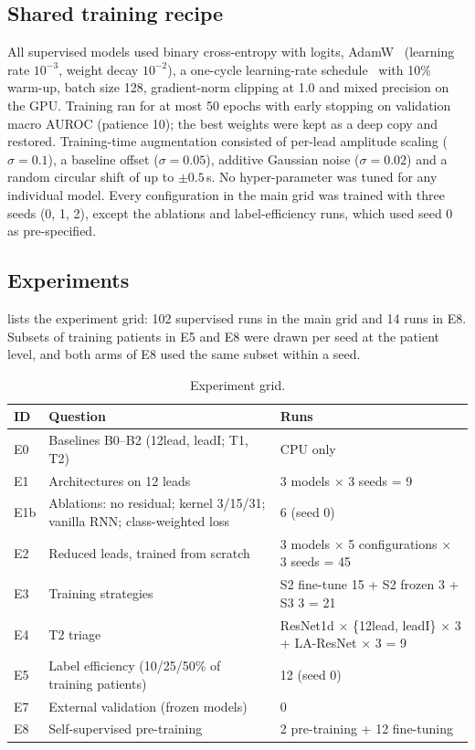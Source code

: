 \subsection{Shared training recipe}
All supervised models used binary cross-entropy with logits, AdamW~\cite{loshchilov2019adamw} (learning rate $10^{-3}$, weight decay $10^{-2}$), a one-cycle learning-rate schedule~\cite{smith2019onecycle} with 10\% warm-up, batch size 128, gradient-norm clipping at 1.0 and mixed precision on the GPU. Training ran for at most 50 epochs with early stopping on validation macro AUROC (patience 10); the best weights were kept as a deep copy and restored. Training-time augmentation consisted of per-lead amplitude scaling ($\sigma=0.1$), a baseline offset ($\sigma=0.05$), additive Gaussian noise ($\sigma=0.02$) and a random circular shift of up to $\pm0.5$\,s. No hyper-parameter was tuned for any individual model. Every configuration in the main grid was trained with three seeds (0, 1, 2), except the ablations and label-efficiency runs, which used seed 0 as pre-specified.

\subsection{Experiments}
 lists the experiment grid: 102 supervised runs in the main grid and 14 runs in E8. Subsets of training patients in E5 and E8 were drawn per seed at the patient level, and both arms of E8 used the same subset within a seed.

\begin{table}[H]
\centering
\small
\caption{Experiment grid.}
\label{tab:experiments}
\begin{tabular}{lp{7.2cm}p{5.2cm}}
\toprule
ID & Question & Runs \\
\midrule
E0 & Baselines B0--B2 (12lead, leadI; T1, T2) & CPU only \\
E1 & Architectures on 12 leads & 3 models $\times$ 3 seeds = 9 \\
E1b & Ablations: no residual; kernel 3/15/31; vanilla RNN; class-weighted loss & 6 (seed 0) \\
E2 & Reduced leads, trained from scratch & 3 models $\times$ 5 configurations $\times$ 3 seeds = 45 \\
E3 & Training strategies & S2 fine-tune 15 + S2 frozen 3 + S3 3 = 21 \\
E4 & T2 triage & ResNet1d $\times$ \{12lead, leadI\} $\times$ 3 + LA-ResNet $\times$ 3 = 9 \\
E5 & Label efficiency (10/25/50\% of training patients) & 12 (seed 0) \\
E7 & External validation (frozen models) & 0 \\
E8 & Self-supervised pre-training & 2 pre-training + 12 fine-tuning \\
\bottomrule
\end{tabular}
\end{table}
